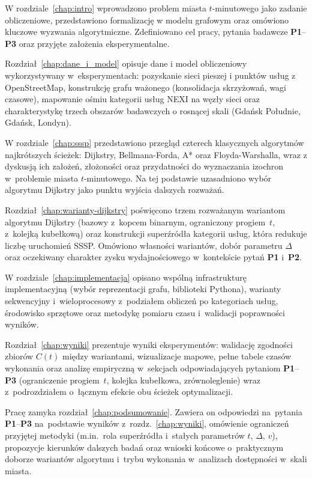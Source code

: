 W rozdziale~\ref{chap:intro} wprowadzono problem miasta $t$-minutowego jako zadanie obliczeniowe,
przedstawiono formalizację w modelu grafowym oraz omówiono kluczowe wyzwania algorytmiczne.
Zdefiniowano cel pracy, pytania badawcze \textbf{P1}--\textbf{P3} oraz przyjęte założenia
eksperymentalne.

Rozdział~\ref{chap:dane_i_model} opisuje dane i model obliczeniowy wykorzystywany
w~eksperymentach: pozyskanie sieci pieszej i punktów usług z OpenStreetMap, konstrukcję
grafu ważonego (konsolidacja skrzyżowań, wagi czasowe), mapowanie ośmiu kategorii usług
NEXI na węzły sieci oraz charakterystykę trzech obszarów badawczych o rosnącej skali
(Gdańsk Południe, Gdańsk, Londyn).

W rozdziale~\ref{chap:sssp} przedstawiono przegląd czterech klasycznych algorytmów
najkrótszych ścieżek: Dijkstry, Bellmana-Forda, A* oraz Floyda-Warshalla, wraz
z dyskusją ich założeń, złożoności oraz przydatności do wyznaczania izochron
w~problemie miasta $t$-minutowego. Na tej podstawie uzasadniono wybór algorytmu Dijkstry
jako punktu wyjścia dalszych rozważań.

Rozdział~\ref{chap:warianty-dijkstry} poświęcono trzem rozważanym wariantom algorytmu
Dijkstry (bazowy z~kopcem binarnym, ograniczony progiem~$t$, z~kolejką kubełkową)
oraz konstrukcji superźródła kategorii usług, która redukuje liczbę uruchomień SSSP.
Omówiono własności wariantów, dobór parametru $\Delta$ oraz oczekiwany charakter zysku
wydajnościowego w~kontekście pytań \textbf{P1} i~\textbf{P2}.

W rozdziale~\ref{chap:implementacja} opisano wspólną infrastrukturę implementacyjną
(wybór reprezentacji grafu, biblioteki Pythona), warianty sekwencyjny i~wieloprocesowy
z~podziałem obliczeń po kategoriach usług, środowisko sprzętowe
oraz metodykę pomiaru czasu i~walidacji poprawności wyników.

Rozdział~\ref{chap:wyniki} prezentuje wyniki eksperymentów: walidację zgodności zbiorów
$C(t)$ między wariantami, wizualizacje mapowe, pełne tabele czasów wykonania
oraz analizę empiryczną w~sekcjach odpowiadających pytaniom \textbf{P1}--\textbf{P3}
(ograniczenie progiem~$t$, kolejka kubełkowa, zrównoleglenie) wraz z~podrozdziałem
o~łącznym efekcie obu ścieżek optymalizacji.

Pracę zamyka rozdział~\ref{chap:podsumowanie}. Zawiera on odpowiedzi
na~pytania \textbf{P1}--\textbf{P3} na~podstawie wyników z~rozdz.~\ref{chap:wyniki},
omówienie ograniczeń przyjętej metodyki (m.in.\ rola superźródła i~stałych parametrów
$t$, $\Delta$, $v$), propozycje kierunków dalszych badań oraz wnioski końcowe
o~praktycznym doborze wariantów algorytmu i~trybu wykonania w~analizach dostępności
w~skali miasta.

